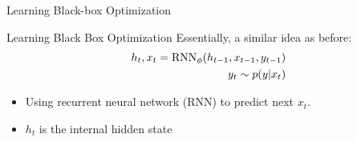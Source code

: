 \begin{frame}[c]{Learning Black-box Optimization~}


\begin{block}{Learning Black Box Optimization}
	Essentially, a similar idea as before:
	\begin{eqnarray}
	h_t, x_t = \text{RNN}_\phi(h_{t-1}, x_{t-1}, y_{t-1}) \nonumber \\
	y_t \sim p(y|x_t)\nonumber
	\end{eqnarray}
	
	\begin{itemize}
		\item Using recurrent neural network (RNN) to predict next $x_t$.
		\item $h_t$ is the internal hidden state 
	\end{itemize}
	
\end{block}



\end{frame}
